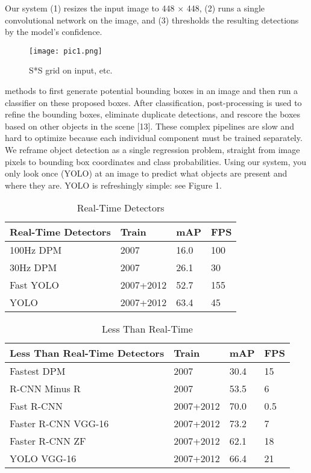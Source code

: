 \documentclass[12pt,a4paper]{article}
\begin{document}
Our system (1) resizes the input image to 448 × 448, (2) runs a single convolutional network on the image, and (3) thresholds the resulting detections by the model’s confidence. 

\begin{figure}[!ht]
\centering
\texttt{[image: pic1.png]}
\caption{\label{pic1.png}S*S grid on input, etc. }
\end{figure}

 methods to first generate potential bounding boxes in an image and then run a classifier on these proposed boxes. After classification, post-processing is used to refine the bounding boxes, eliminate duplicate detections, and rescore the boxes based on other objects in the scene [13]. These complex pipelines are slow and hard to optimize because each individual component must be trained separately. We reframe object detection as a single regression problem, straight from image pixels to bounding box coordinates and class probabilities. Using our system, you only look once (YOLO) at an image to predict what objects are present and where they are. YOLO is refreshingly simple: see Figure 1.

\begin{table}[!ht]
\caption{Real-Time Detectors\label{tab0}}
\begin{threeparttable}
\begin{tabular*}{\columnwidth}{@{\extracolsep\fill}|l|l|l|l|@{\extracolsep\fill}}
\toprule
Real-Time Detectors & Train & mAP & FPS\\
\midrule
100Hz DPM & 2007 & 16.0 & 100 \\
30Hz DPM & 2007 & 26.1 & 30 \\
Fast YOLO & 2007+2012 & 52.7 & 155 \\
YOLO & 2007+2012 &  63.4 & 45 \\


\bottomrule
\end{tabular*}
\end{threeparttable}
\end{table}


\begin{table}[!ht]
\caption{Less Than Real-Time\label{tab0}}
\begin{threeparttable}
\begin{tabular*}{\columnwidth}{@{\extracolsep\fill}|l|l|l|l|@{\extracolsep\fill}}
\toprule
Less Than Real-Time Detectors & Train & mAP & FPS\\
\midrule

Fastest DPM & 2007 & 30.4 & 15\\
R-CNN Minus R & 2007 & 53.5 & 6\\
Fast R-CNN & 2007+2012 & 70.0 & 0.5\\
Faster R-CNN VGG-16 & 2007+2012 & 73.2 & 7\\
Faster R-CNN ZF & 2007+2012 & 62.1 & 18\\
YOLO VGG-16 & 2007+2012 & 66.4 & 21\\

\bottomrule
\end{tabular*}
\end{threeparttable}
\end{table}
\end{document}
